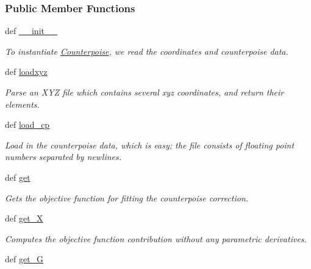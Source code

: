 \subsubsection*{\-Public \-Member \-Functions}
\begin{DoxyCompactItemize}
\item 
def \hyperlink{classforcebalance_1_1counterpoise_1_1Counterpoise_a59ca75843c1cc5fec89f40c8a220039d}{\-\_\-\-\_\-init\-\_\-\-\_\-}
\begin{DoxyCompactList}\small\item\em \-To instantiate \hyperlink{classforcebalance_1_1counterpoise_1_1Counterpoise}{\-Counterpoise}, we read the coordinates and counterpoise data. \end{DoxyCompactList}\item 
def \hyperlink{classforcebalance_1_1counterpoise_1_1Counterpoise_a8795bd01b0f62b3f612e4e5c762f96f8}{loadxyz}
\begin{DoxyCompactList}\small\item\em \-Parse an \-X\-Y\-Z file which contains several xyz coordinates, and return their elements. \end{DoxyCompactList}\item 
def \hyperlink{classforcebalance_1_1counterpoise_1_1Counterpoise_afdbc053ae726ac5e4066087bcc1039b1}{load\-\_\-cp}
\begin{DoxyCompactList}\small\item\em \-Load in the counterpoise data, which is easy; the file consists of floating point numbers separated by newlines. \end{DoxyCompactList}\item 
def \hyperlink{classforcebalance_1_1counterpoise_1_1Counterpoise_a5fd50a4bb7d5e939b7e99ac648b35d59}{get}
\begin{DoxyCompactList}\small\item\em \-Gets the objective function for fitting the counterpoise correction. \end{DoxyCompactList}\item 
def \hyperlink{classforcebalance_1_1target_1_1Target_a606dd136f195c267c05a2455405e5949}{get\-\_\-\-X}
\begin{DoxyCompactList}\small\item\em \-Computes the objective function contribution without any parametric derivatives. \end{DoxyCompactList}\item 
def \hyperlink{classforcebalance_1_1target_1_1Target_afa8cc38c8bba8861c072e789717aa049}{get\-\_\-\-G}

\end{DoxyCompactItemize}
